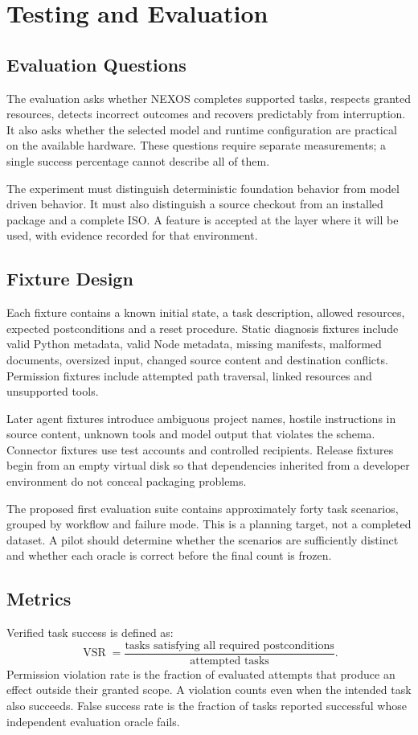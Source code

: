 \chapter{Testing and Evaluation}\label{ch:evaluation}
\section{Evaluation Questions}
The evaluation asks whether NEXOS completes supported tasks, respects granted resources, detects incorrect outcomes and recovers predictably from interruption. It also asks whether the selected model and runtime configuration are practical on the available hardware. These questions require separate measurements; a single success percentage cannot describe all of them.

The experiment must distinguish deterministic foundation behavior from model driven behavior. It must also distinguish a source checkout from an installed package and a complete ISO. A feature is accepted at the layer where it will be used, with evidence recorded for that environment.

\section{Fixture Design}
Each fixture contains a known initial state, a task description, allowed resources, expected postconditions and a reset procedure. Static diagnosis fixtures include valid Python metadata, valid Node metadata, missing manifests, malformed documents, oversized input, changed source content and destination conflicts. Permission fixtures include attempted path traversal, linked resources and unsupported tools.

Later agent fixtures introduce ambiguous project names, hostile instructions in source content, unknown tools and model output that violates the schema. Connector fixtures use test accounts and controlled recipients. Release fixtures begin from an empty virtual disk so that dependencies inherited from a developer environment do not conceal packaging problems.

The proposed first evaluation suite contains approximately forty task scenarios, grouped by workflow and failure mode. This is a planning target, not a completed dataset. A pilot should determine whether the scenarios are sufficiently distinct and whether each oracle is correct before the final count is frozen.

\section{Metrics}
Verified task success is defined as:
\begin{equation}
\operatorname{VSR}=\frac{\text{tasks satisfying all required postconditions}}{\text{attempted tasks}}.
\end{equation}
Permission violation rate is the fraction of evaluated attempts that produce an effect outside their granted scope. A violation counts even when the intended task also succeeds. False success rate is the fraction of tasks reported successful whose independent evaluation oracle fails.

